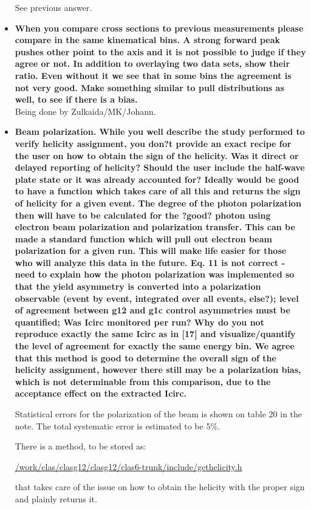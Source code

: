 \documentclass[ 12 pt]{article}
\begin{document}
\begin{itemize}
See previous answer.


\item \textbf{When you compare cross sections to previous measurements please
compare in the same kinematical bins. A strong forward peak pushes other
point to the axis and it is not possible to judge if they agree or not. In addition
to overlaying two data sets, show their ratio. Even without it we see that in
some bins the agreement is not very good. Make something similar to pull
distributions as well, to see if there is a bias.}\\

Being done by Zulkaida/MK/Johann.


\item \textbf{Beam polarization. While you well describe the study performed to verify
helicity assignment, you don?t provide an exact recipe for the user on how to
obtain the sign of the helicity. Was it direct or delayed reporting of helicity?
Should the user include the half-wave plate state or it was already accounted
for? Ideally would be good to have a function which takes care of all this and
returns the sign of helicity for a given event. The degree of the photon
polarization then will have to be calculated for the ?good? photon using
electron beam polarization and polarization transfer. This can be made a
standard function which will pull out electron beam polarization for a given
run. This will make life easier for those who will analyze this data in the
future. Eq. 11 is not correct - need to explain how the photon polarization
was implemented so that the yield asymmetry is converted into a
polarization observable (event by event, integrated over all events, else?);
level of agreement between g12 and g1c control asymmetries must be
quantified; Was Icirc monitored per run? Why do you not reproduce exactly
the same Icirc as in [17] and visualize/quantify the level of agreement for
exactly the same energy bin. We agree that this method is good to determine
the overall sign of the helicity assignment, however there still may be a
polarization bias, which is not determinable from this comparison, due to the
acceptance effect on the extracted Icirc.}



Statistical errors for the polarization of the beam is shown on table 20 in the note. The total systematic error is estimated to be 5\%.

There is a method, to be stored as:
\begin{center}
\url{/work/clas/clasg12/clasg12/clas6-trunk/include/gethelicity.h}
\end{center}
that takes care of the issue on how to obtain the helicity with the proper sign and plainly returns it.



\end{itemize}
\end{document}
